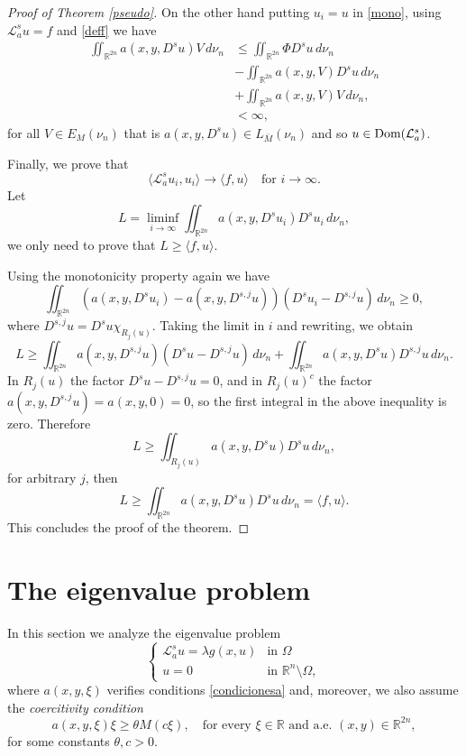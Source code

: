 \documentclass{amsart}
\def\Dom{\text{\normalfont Dom}}
\newcommand{\A}{\mathcal{L}_a^s}
\newcommand{\R}{{\mathbb R}}
\theoremstyle{remark}
\theoremstyle{definition}
\numberwithin{equation}{section}
\begin{document}
\begin{proof}[Proof of Theorem \ref{pseudo}]
On the other hand putting $u_i=u$ in \eqref{mono}, using $\A u=f$ and \eqref{deff} we have
\begin{align*}
\iint_{\R^{2n}} a(x,y,D^s u)V\,d\nu_n&\leq \iint_{\R^{2n}} \Phi D^s u\,d\nu_n
\\
&-\iint_{\R^{2n}} a(x,y,V)D^s u\,d\nu_n
\\
&+\iint_{\R^{2n}} a(x,y,V)V\,d\nu_n,
\\
&<\infty,
\end{align*}
for all $V\in E_M(\nu_n)$ that is $a(x,y,D^su)\in L_{\bar{M}}(\nu_n)$ and so $u\in \Dom(\A)$.

Finally, we prove that 
$$
\langle \A u_i, u_i \rangle \to \langle f, u \rangle \quad \text{for } i \to \infty.
$$
Let  
$$
L = \liminf_{i \to \infty} \iint_{\mathbb{R}^{2n}} a(x,y,D^s u_i) D^s u_i \, d\nu_n,
$$
we only need to prove that \( L \geq \langle f, u \rangle \). 

Using the monotonicity property again we have  
$$
\iint_{\mathbb{R}^{2n}} \left(a(x,y,D^s u_i) - a(x,y,D^{s,j}u) \right) (D^s u_i - D^{s,j}u) \, d\nu_n \geq 0,
$$
where $ D^{s,j}u = D^s u \chi_{R_j(u)}$. Taking the limit in \( i \) and rewriting, we obtain  
$$
L \geq \iint_{\mathbb{R}^{2n}} a(x,y,D^{s,j}u)(D^s u - D^{s,j}u) \, d\nu_n + \iint_{\mathbb{R}^{2n}} a(x,y,D^s u) D^{s,j}u \, d\nu_n.
$$
In $ R_j(u)$ the factor $D^s u - D^{s,j}u = 0$, and in $R_j(u)^c$ the factor $a(x,y,D^{s,j}u)=a(x,y,0)=0$, so the first integral in the above inequality is zero. Therefore  
$$
L \geq \iint_{R_j(u)}a(x,y,D^s u) D^s u \, d\nu_n,
$$
for arbitrary $j$, then  
$$
L \geq \iint_{\mathbb{R}^{2n}}a(x,y,D^s u) D^s u \, d\nu_n = \langle f, u \rangle.
$$
This concludes the proof of the theorem.
\end{proof}
\section{The eigenvalue problem}\label{eigenproblem}
In this section we analyze the eigenvalue problem
\begin{equation}\label{mainproblem}
\begin{cases}
\A u=\lambda g(x, u) &\text{in }\Omega\\
u=0&\text{in }\R^n\setminus \Omega,
\end{cases}
\end{equation}
where $a(x, y, \xi)$ verifies conditions \ref{condicionesa} and, moreover, we also assume the {\em coercitivity condition}
\begin{equation}\label{coersive}
a(x, y, \xi)\xi\ge \theta M(c\xi), \quad \text{for every $\xi\in \R$ and a.e. $(x, y)\in \R^{2n},$}
\end{equation}
for some constants $\theta, c>0$.
\end{document}
